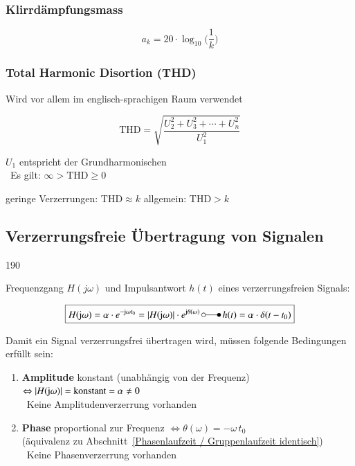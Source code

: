 \subsubsection{Klirrdämpfungsmass}

$$ \boxed{ a_k = 20 \cdot \log_{10} \Big( \frac{1}{k}  \Big)  } $$


\subsubsection{Total Harmonic Disortion (THD)}
Wird vor allem im englisch-sprachigen Raum verwendet

\begin{minipage}[b]{0.48\columnwidth}
   $$ \boxed{  \text{THD} = \sqrt{\frac{U_2^2 + U_3^2 + \cdots + U_n^2}{U_1^2} } } $$
\end{minipage}
\hfill
\begin{minipage}[c]{0.48\columnwidth}
    \raggedright%
    $U_1$ entspricht der Grundharmonischen\\
    \textrightarrow\ Es gilt:  $\infty > \text{THD} \geq 0$ 
\end{minipage}

\vspace{0.2cm}
geringe Verzerrungen: $\text{THD} \approx k$ \qquad allgemein: $\text{THD} > k$


\subsection{Verzerrungsfreie Übertragung von Signalen}{190}

Frequenzgang $H(j \omega)$ und Impulsantwort $h(t)$ eines verzerrungsfreien Signals:

$$ \boxed{ H(\jimg  \omega) = \alpha \cdot e^{- \jimg  \omega t_0} 
    = | H(\jimg  \omega)|  \cdot e^{\jimg  \theta(\omega)}  \, \laplace \,  h(t) = \alpha \cdot \delta(t - t_0) } $$


Damit ein Signal verzerrungsfrei übertragen wird, müssen folgende Bedingungen erfüllt sein:

\begin{enumerate}
    \item \textbf{Amplitude} konstant (unabhängig von der Frequenz) $\Leftrightarrow | H(\mathrm{j}  \omega)| = \text{konstant} = \alpha \neq 0$\\
        \textrightarrow\ Keine Amplitudenverzerrung vorhanden
    \item \textbf{Phase} proportional zur Frequenz $\Leftrightarrow \theta(\omega) = - \omega \, t_0$\\
        (äquivalenz zu Abschnitt\ \ref{Phasenlaufzeit / Gruppenlaufzeit identisch})
        \textrightarrow\ Keine Phasenverzerrung vorhanden
\end{enumerate}


